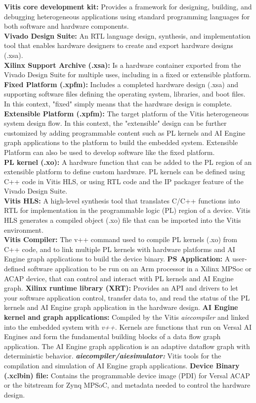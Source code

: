 \documentclass{article}
\begin{document}
  \textbf{Vitis core development kit:} Provides a framework for designing, building, and debugging heterogeneous applications using standard programming languages for both software and hardware components.\\
  \textbf{Vivado Design Suite:} An RTL language design, synthesis, and implementation tool that enables hardware designers to create and export hardware designs (.xsa).\\
  \textbf{Xilinx Support Archive (.xsa):} Is a hardware container exported from the Vivado Design Suite for multiple uses, including in a fixed or extensible platform.\\
  \textbf{Fixed Platform (.xpfm):} Includes a completed hardware design (.xsa) and supporting software files defining the operating system, libraries, and boot files. In this context, "fixed" simply means that the hardware design is complete.\\
  \textbf{Extensible Platform (.xpfm):} The target platform of the Vitis heterogeneous system design flow. In this context, the "extensible" design can be further customized by adding programmable content such as PL kernels and AI Engine graph applications to the platform to build the embedded system. Extensible Platform can also be used to develop software like the fixed platform.\\
  \textbf{PL kernel (.xo):} A hardware function that can be added to the PL region of an extensible platform to define custom hardware. PL kernels can be defined using C++ code in Vitis HLS, or using RTL code and the IP packager feature of the Vivado Design Suite.\\
  \textbf{Vitis HLS:} A high-level synthesis tool that translates C/C++ functions into RTL for implementation in the programmable logic (PL) region of a device. Vitis HLS generates a compiled object (.xo) file that can be imported into the Vitis environment.\\
  \textbf{Vitis Compiler:} The v++ command used to compile PL kernels (.xo) from C++ code, and to link multiple PL kernels with hardware platforms and AI Engine graph applications to build the device binary.
  \textbf{PS Application:} A user-defined software application to be run on an Arm processor in a Xilinx MPSoc or ACAP device, that can control and interact with PL kernels and AI Engine graph.
  \textbf{Xilinx runtime library (XRT):} Provides an API and drivers to let your software application control, transfer data to, and read the status of the PL kernels and AI Engine graph application in the hardware design.
  \textbf{AI Engine kernel and graph applications:} Compiled by the Vitis \textit{aiecompiler} and linked into the embedded system with \textit{v++}. Kernels are functions that run on Versal AI Engines and form the fundamental building blocks of a data flow graph application. The AI Engine graph application is an adaptive dataflow graph with deterministic behavior.
  \textbf{\textit{aiecompiler/aiesimulator:}} Vitis tools for the compilation and simulation of AI Engine graph applications.
  \textbf{Device Binary (.xclbin) file:} Contains the programmable device image (PDI) for Versal ACAP or the bitstream for Zynq MPSoC, and metadata needed to control the hardware design.
\end{document}
